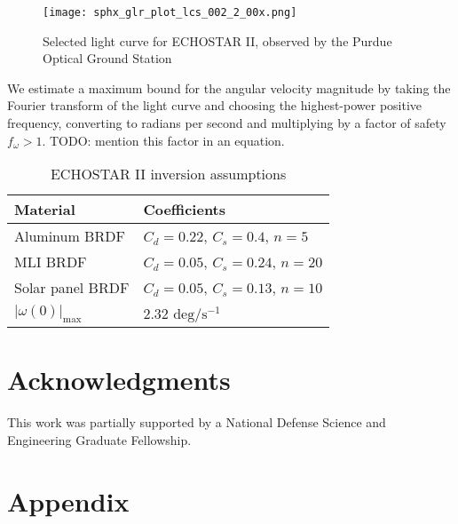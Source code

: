 \documentclass[a4paper,twocolumn]{spaceDebrisC} %
\newcommand{\figbig}[0]{0.5\textwidth}
\begin{document}
\begin{figure}[H]
  \centering
  \texttt{[image: sphx\_glr\_plot\_lcs\_002\_2\_00x.png]}
  \caption{Selected light curve for ECHOSTAR II, observed by the Purdue Optical Ground Station}
  \label{fig:sat_lc_obs}
\end{figure}

We estimate a maximum bound for the angular velocity magnitude by taking the Fourier transform of the light curve and choosing the highest-power positive frequency, converting to radians per second and multiplying by a factor of safety $f_\omega > 1$. TODO: mention this factor in an equation.

\begin{table}[H]
  \centering
  \caption{ECHOSTAR II inversion assumptions}
  \vspace*{6pt}
  \begin{tabular}{|l|l|}
  \hline
  \textbf{Material} & \textbf{Coefficients} \\ \hline
  Aluminum BRDF & $C_d=0.22$, $C_s=0.4$, $n=5$ \\ \hline
  MLI BRDF & $C_d=0.05$, $C_s=0.24$, $n=20$ \\ \hline
  Solar panel BRDF & $C_d=0.05$, $C_s=0.13$, $n=10$ \\ \hline
  $|\omega(0)|_\text{max}$ & $2.32$ $\text{deg} / \text{s}^{-1}$ \\ \hline
  \end{tabular}
  \label{tb:case2_ass}
\end{table}

\section*{Acknowledgments}

This work was partially supported by a National Defense Science and Engineering Graduate Fellowship.

\section*{Appendix}
\end{document}

